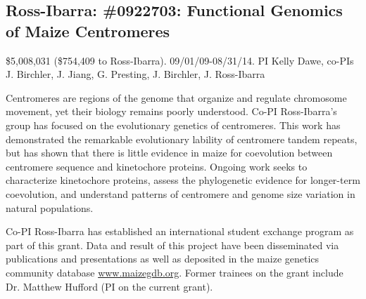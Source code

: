 \subsection*{Ross-Ibarra: \#0922703: Functional Genomics of Maize Centromeres}
\$5,008,031 (\$754,409 to Ross-Ibarra). 09/01/09-08/31/14. PI Kelly Dawe, co-PIs J. Birchler, J. Jiang, G. Presting, J. Birchler, J. Ross-Ibarra\\
\par{} Centromeres are regions of the genome that organize and regulate chromosome movement, yet their biology remains poorly understood. Co-PI Ross-Ibarra's group has focused on the evolutionary genetics of centromeres. This work has demonstrated the remarkable evolutionary lability of centromere tandem repeats, but has shown that there is little evidence in maize for coevolution between centromere sequence and kinetochore proteins. Ongoing work seeks to characterize kinetochore proteins, assess the phylogenetic evidence for longer-term coevolution, and understand patterns of centromere and genome size variation in natural populations.\\
\par{}  Co-PI Ross-Ibarra has established an international student exchange program as part of this grant. Data and result of this project have been disseminated via publications and presentations as well as deposited in the maize genetics community database \url{www.maizegdb.org}. Former trainees on the grant include Dr. Matthew Hufford (PI on the current grant).\\ 
\par{} \citet{Shi2010a, Chia2012a, Fang2012, Hufford2012, Hufford2012b, Hufford2013, Melters2013a, Kanizay2013, Pyhajarvi2013}

